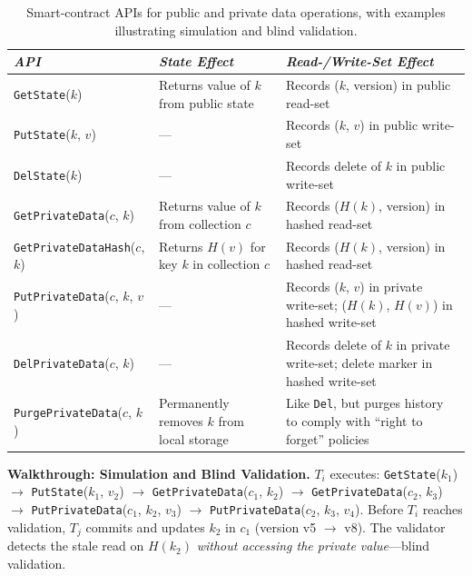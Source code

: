 \begin{table}[t]
\small
\centering
\caption{Smart-contract APIs for public and private data operations, with examples illustrating simulation and blind validation.}
  \vspace{-0.3cm}
\label{table:apis}
\begin{tabular}{| l | l | l |}
\hline
\textit{API} & \textit{State Effect} & \textit{Read-/Write-Set Effect} \\ \hline
\texttt{GetState}($k$) & Returns value of $k$ from public state & Records ($k$, version) in public read-set \\ \hline
\texttt{PutState}($k$, $v$) & --- & Records ($k$, $v$) in public write-set \\ \hline
\texttt{DelState}($k$) & --- & Records delete of $k$ in public write-set \\ \hline
\texttt{GetPrivateData}($c$, $k$) & Returns value of $k$ from collection $c$ & Records ($H(k)$, version) in hashed read-set \\ \hline
\texttt{GetPrivateDataHash}($c$, $k$) & Returns $H(v)$ for key $k$ in collection $c$ & Records ($H(k)$, version) in hashed read-set \\ \hline
\texttt{PutPrivateData}($c$, $k$, $v$) & --- & Records ($k$, $v$) in private write-set; ($H(k)$, $H(v)$) in hashed write-set \\ \hline
\texttt{DelPrivateData}($c$, $k$) & --- & Records delete of $k$ in private write-set; delete marker in hashed write-set \\ \hline
\texttt{PurgePrivateData}($c$, $k$) & Permanently removes $k$ from local storage & Like \texttt{Del}, but purges history to comply with ``right to forget'' policies \\ \hline
\end{tabular}

\begin{minipage}[t]{\textwidth}
\vspace{4pt}
\small
\textbf{Walkthrough: Simulation and Blind Validation.}
$T_i$ executes: \texttt{GetState}($k_1$) $\to$ \texttt{PutState}($k_1$, $v_2$) $\to$ \texttt{GetPrivateData}($c_1$, $k_2$) $\to$ \texttt{GetPrivateData}($c_2$, $k_3$) $\to$ \texttt{PutPrivateData}($c_1$, $k_2$, $v_3$) $\to$ \texttt{PutPrivateData}($c_2$, $k_3$, $v_4$).
Before $T_i$ reaches validation, $T_j$ commits and updates $k_2$ in $c_1$ (version v5 $\to$ v8). The validator detects the stale read on $H(k_2)$ \emph{without accessing the private value}---blind validation.


\end{minipage}
\end{table}
